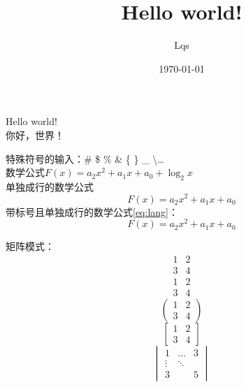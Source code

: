 \documentclass[UTF8,a4paper]{article}
\title{Hello world!} %
\author[*]{Lqs} %
\affil[*]{单位1, \authorcr 作者1、3、4的邮箱} %
\date{\today} %
\newcommand{\wuhao}{\zihao{5}}%
\begin{document}
	\maketitle %
	Hello world! \\  %
	\wuhao %
	你好，\qquad 世界！%
		
	
	特殊符号的输入：\# \$ \% \& \{ \} \_ \textbackslash \ldots \\
	
	数学公式$F(x)=a_2x^2+a_1x+a_0+\log_2x$ \\%
	单独成行的数学公式\[F(x)=a_2x^2+a_1x+a_0\] %
	带标号且单独成行的数学公式\ref{eq:lang}：
	\begin{equation}
	F(x)=a_2x^2+a_1x+a_0 \label{eq:lang}%
	\end{equation}
	
	
	矩阵模式：
	\[%
    \begin{array}{c|c}
	1 & 2 \\ 
	\hline
	3 & 4
	\end{array}
	\]
	\[%
	\begin{matrix}
	1 & 2 \\ 
	3 & 4
	\end{matrix} 
	\]
	\[%
	\begin{pmatrix}
	1 & 2 \\ 
	3 & 4
	\end{pmatrix} 
	\]
	\[%
	\begin{bmatrix}
	1 & 2 \\ 
	3 & 4
	\end{bmatrix} 
	\]
	\[%
	\begin{vmatrix}
	1 & \dots & 3 \\ %
	\vdots & \ddots &   \\  %
	3 &   & 5
	\end{vmatrix} 
	\]
	
\end{document}
